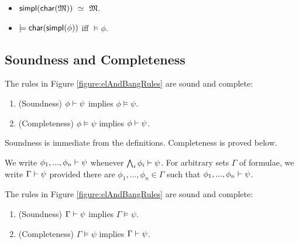 \begin{itemize}

\item $\mathsf{simpl}(\mathsf{char}(\frak{M})) \ \simeq \  \frak{M}$. 

\item $\models \mathsf{char}(\mathsf{simpl}(\phi))$ iff $\models\phi$.

\end{itemize}


\subsection{Soundness and Completeness}

\begin{theorem}\label{theorem:elAndBang:soundComplete}
The rules in Figure \ref{figure:elAndBangRules} are sound and complete:
\begin{enumerate}

\item\label{theorem:elAndBang:sound} (Soundness) $\phi \vdash \psi$ implies $\phi \models \psi$.

\item\label{theorem:elAndBang:complete} (Completeness) $\phi \models \psi$ implies $\phi \vdash \psi$.

\end{enumerate}
\end{theorem}

\NI Soundness is immediate from the definitions. Completeness is
proved below. 

\begin{definition}
We write $\phi_1, ...,
\phi_n \vdash \psi$ whenever $\bigwedge_{i}\phi_i \vdash \psi$.  For
arbitrary sets $\Gamma$ of formulae, we write $\Gamma \vdash \psi$
provided there are $\phi_1, ..., \phi_n \in \Gamma$ such that $\phi_1,
..., \phi_n \vdash \psi$.
\end{definition}

\begin{corollary}
The rules in Figure \ref{figure:elAndBangRules} are sound and complete:
\begin{enumerate}

\item(Soundness) $\Gamma \vdash \psi$ implies $\Gamma \models \psi$.

\item (Completeness) $\Gamma \models \psi$ implies $\Gamma \vdash \psi$. 

\end{enumerate}
\end{corollary}

